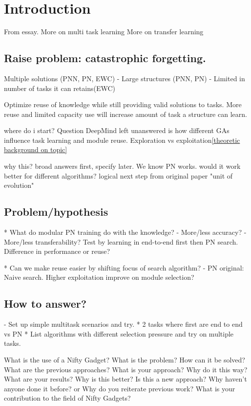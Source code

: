 \chapter{Introduction}
From essay. 
More on multi task learning
More on transfer learning

\section{Raise problem: catastrophic forgetting.}
Multiple solutions (PNN, PN, EWC)
- Large structures (PNN, PN)
- Limited in number of tasks it can retains(EWC)

Optimize reuse of knowledge while still providing valid solutions to tasks. More reuse and limited capacity use will increase amount of task a structure can learn. 

where do i start?
Question DeepMind left unanswered is how different GAs influence task learning and module reuse. 
Exploration vs exploitation\ref{theoretic background on topic}

why this? broad answers first, specify later. 
We know PN works. would it work better for different algorithms?
logical next step from original paper "unit of evolution"

\section{Problem/hypothesis}
* What do modular PN training do with the knowledge? 
- More/less accuracy?
- More/less transferability? 
Test by learning in end-to-end first then PN search. 
Difference in performance or reuse?

* Can we make reuse easier by shifting focus of search algorithm?
- PN original: Naive search. Higher exploitation improve on module selection?

\section{How to answer?}
- Set up simple multitask scenarios and try. 
* 2 tasks where first are end to end vs PN
* List algorithms with different selection pressure and try on multiple tasks. 

\iffalse
    What is the use of a Nifty Gadget? 
    What is the problem? 
    How can it be solved? 
    What are the previous approaches? 
    What is your approach? 
    Why do it this way? 
    What are your results? 
    Why is this better? 
    Is this a new approach? 
    Why haven't anyone done it before? 
    or
    Why do you reiterate previous work? 
    What is your contribution to the field of Nifty Gadgets? 
    
